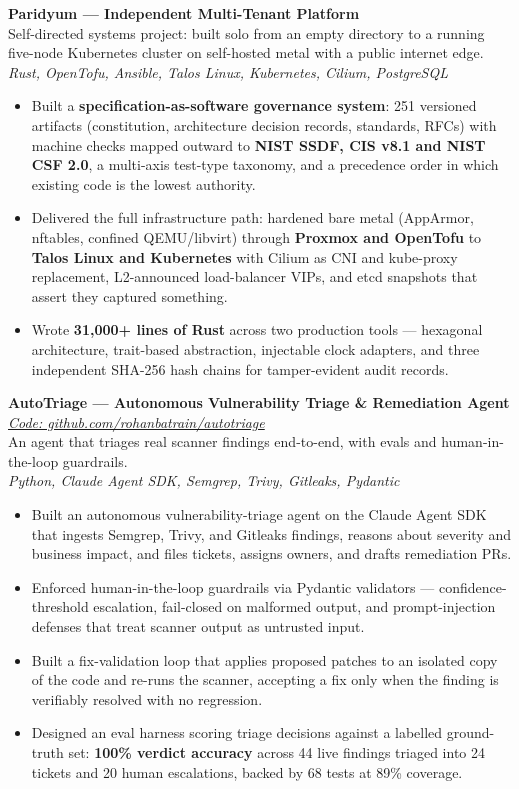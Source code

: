 \documentclass[10pt,a4paper]{article}
\newcommand{\entry}[3]{%
  \textbf{#1}\hfill\textit{\small #2}\\[-0.15em]
  {\small #3}\par\vspace{0.08em}%
}
\begin{document}
\entry{Paridyum --- Independent Multi-Tenant Platform}{}{Self-directed systems project: built solo from an empty directory to a running five-node Kubernetes cluster on self-hosted metal with a public internet edge.\\ \textit{Rust, OpenTofu, Ansible, Talos Linux, Kubernetes, Cilium, PostgreSQL}}
\begin{itemize}
  \item Built a \textbf{specification-as-software governance system}: 251 versioned artifacts (constitution, architecture decision records, standards, RFCs) with machine checks mapped outward to \textbf{NIST SSDF, CIS v8.1 and NIST CSF 2.0}, a multi-axis test-type taxonomy, and a precedence order in which existing code is the lowest authority.
  \item Delivered the full infrastructure path: hardened bare metal (AppArmor, nftables, confined QEMU/libvirt) through \textbf{Proxmox and OpenTofu} to \textbf{Talos Linux and Kubernetes} with Cilium as CNI and kube-proxy replacement, L2-announced load-balancer VIPs, and etcd snapshots that assert they captured something.
  \item Wrote \textbf{31,000+ lines of Rust} across two production tools --- hexagonal architecture, trait-based abstraction, injectable clock adapters, and three independent SHA-256 hash chains for tamper-evident audit records.
\end{itemize}

\entry{AutoTriage --- Autonomous Vulnerability Triage \& Remediation Agent}{}{\textit{\href{https://github.com/rohanbatrain/autotriage}{Code: github.com/rohanbatrain/autotriage}}\\ An agent that triages real scanner findings end-to-end, with evals and human-in-the-loop guardrails.\\ \textit{Python, Claude Agent SDK, Semgrep, Trivy, Gitleaks, Pydantic}}
\begin{itemize}
  \item Built an autonomous vulnerability-triage agent on the Claude Agent SDK that ingests Semgrep, Trivy, and Gitleaks findings, reasons about severity and business impact, and files tickets, assigns owners, and drafts remediation PRs.
  \item Enforced human-in-the-loop guardrails via Pydantic validators --- confidence-threshold escalation, fail-closed on malformed output, and prompt-injection defenses that treat scanner output as untrusted input.
  \item Built a fix-validation loop that applies proposed patches to an isolated copy of the code and re-runs the scanner, accepting a fix only when the finding is verifiably resolved with no regression.
  \item Designed an eval harness scoring triage decisions against a labelled ground-truth set: \textbf{100\% verdict accuracy} across 44 live findings triaged into 24 tickets and 20 human escalations, backed by 68 tests at 89\% coverage.
\end{itemize}
\end{document}
